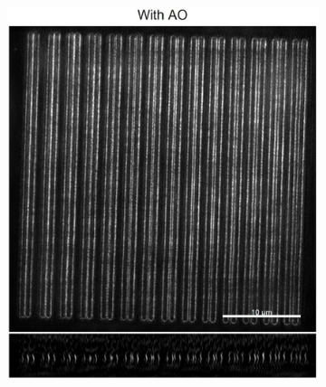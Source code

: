 \begin{figure}
\begin{subfigure}[t]{0.45\textwidth}
		\includegraphics[width=\linewidth]{images/Argolight_slide_AO.jpg}
		\caption{}
		\label{fig:Argolight_slide_AO}
	\end{subfigure}
	

\end{figure}
